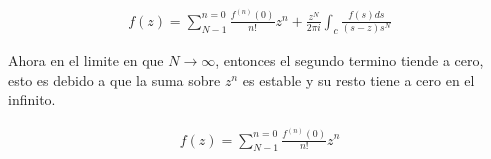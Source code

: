 \begin{gather*}
    f(z) = \sum_{N-1}^{n = 0} \frac{f^{(n)}(0)}{n!} z^n+ \frac{z^N}{2\pi i}\int_c \frac{f(s)ds}{(s-z)s^N}
\end{gather*}

Ahora en el limite en que $N \rightarrow \infty$, entonces el segundo termino tiende a cero, esto es debido a que la suma sobre $z^n$ es estable y su resto tiene a cero en el infinito. 

\begin{mdframed}
    \vspace{-0.5cm}
    \begin{gather}
        f(z) = \sum_{N-1}^{n = 0} \frac{f^{(n)}(0)}{n!} z^n
    \end{gather}
\end{mdframed}


